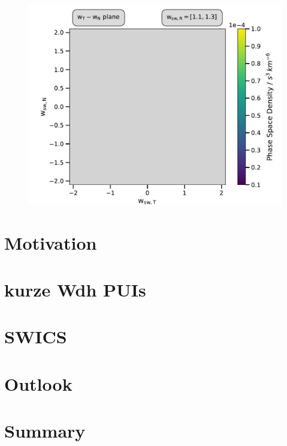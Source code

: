 \documentclass{beamer}
\begin{document}
\begin{frame}[plain]{}
\begin{figure}
	\includegraphics[scale=.6]{Pics/cart_50_step4.pdf}
\end{figure}
\end{frame}





%
%
%
\section{Motivation}
\section{kurze Wdh PUIs}
\section{SWICS}

\section{Outlook}
\section{Summary}
%
%
%
\end{document}

